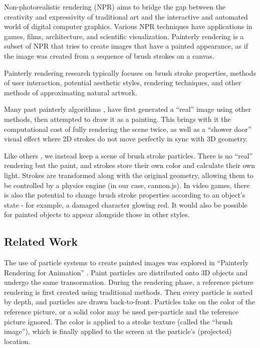 \documentclass[conference]{acmsiggraph}
\begin{document}
Non-photorealistic rendering (NPR) aims to bridge the gap between the
creativity and expressivity of traditional art and the interactive and
automated world of digital computer graphics. Various NPR techniques have
applications in games, films, architecture, and scientific visualization.
Painterly rendering is a subset of NPR that tries to create images that have a
painted appearance, as if the image was created from a sequence of brush
strokes on a canvas.

Painterly rendering research typically focuses on brush stroke properties,
methods of user interaction, potential aesthetic styles, rendering techniques,
and other methods of approximating natural artwork.

Many past painterly algorithms \cite{Hertzmann:1998:PRC:280814.280951},
\cite{Lu:2010:IPS:1730804.1730825} have first generated a ``real'' image using
other methods, then attempted to draw it as a painting. This brings with it the
computational cost of fully rendering the scene twice, as well as a
``shower door'' visual effect where 2D strokes do not move perfectly in sync
with 3D geometry.

Like others \cite{Meier:1996:PRA:237170.237288}, we instead keep a scene of
brush stroke particles. There is no ``real'' rendering but the paint, and
strokes store their own color and calculate their own light. Strokes are
transformed along with the original geometry, allowing them to be controlled by
a physics engine (in our case, cannon.js). In video games, there is also the
potential to change brush stroke properties according to an object’s state -
for example, a damaged character glowing red. It would also be possible for
painted objects to appear alongside those in other styles.


\subsection{Related Work}

The use of particle systems to create painted images was explored in
``Painterly Rendering for Animation'' \cite{Meier:1996:PRA:237170.237288}.
Paint particles are distributed onto 3D objects and undergo the same
transormation. During the rendering phase, a reference picture rendering is
first created using traditional methods. Then every particle is sorted by
depth, and particles are drawn back-to-front. Particles take on the color of
the reference picture, or a solid color may be used per-particle and the
reference picture ignored. The color is applied to a stroke texture (called
the ``brush image''), which is finally applied to the screen at the particle's
(projected) location.
\end{document}
